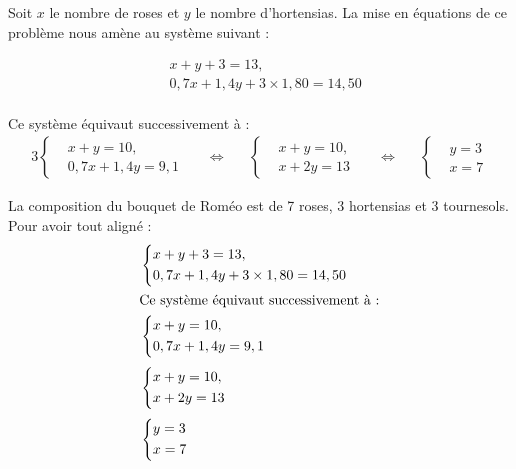 \documentclass[a4paper,10pt,svgnames,landscape]{report}
\begin{document}
Soit $x$ le nombre de roses et $y$ le nombre d'hortensias.
La mise en équations de ce problème nous amène au système suivant :

\begin{align*}[left={\empheqlbrace\,}]
	& x+y+3 = 13, \\
	& 0,7x+1,4y+3\times1,80 =14,50
\end{align*}\\
{Ce système équivaut successivement à :}
\begin{alignat*}{3}
	\left\{
		\begin{aligned}
			& x+y = 10, \\
			& 0,7x+1,4y = 9,1
		\end{aligned}
	\right.
	& \quad\iff\quad
	& \left\{
		\begin{aligned}
			& x+y = 10, \\
			& x+2y = 13
		\end{aligned}
	\right.
	& \quad\iff\quad
	& \left\{
		\begin{aligned}
			& y =3\\ & x = 7
		\end{aligned}
	\right.
\end{alignat*}

La composition du bouquet de Roméo est de 7 roses, 3 hortensias et 3 tournesols.\\

Pour avoir tout aligné :\\

\begin{align*}
	& \left\{
		\begin{aligned}
			& x+y+3 = 13, \\
			& 0,7x+1,4y+3\times1,80 =14,50
		\end{aligned}
	\right.
	\\
	\shortintertext{Ce système équivaut successivement à :}
	& \left\{
		\begin{aligned}
			& x+y = 10, \\
			& 0,7x+1,4y = 9,1
		\end{aligned}
	\right.
	\\[3pt]
	& \left\{
		\begin{aligned}
			& x+y = 10, \\
			& x+2y = 13
		\end{aligned}
	\right.
	\\[3pt]
	& \left\{
		\begin{aligned}
			& y =3\\ & x = 7
		\end{aligned}
	\right.
\end{align*}
\end{document}
